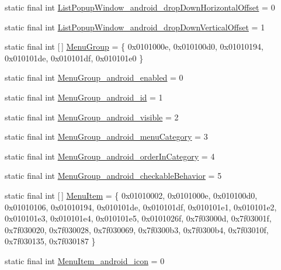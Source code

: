 \begin{DoxyCompactItemize}
static final int \mbox{\hyperlink{classandroid_1_1support_1_1design_1_1R_1_1styleable_a5cbe1721ac6cfb1ee789c9bf9756625f}{List\+Popup\+Window\+\_\+android\+\_\+drop\+Down\+Horizontal\+Offset}} = 0
\item 
static final int \mbox{\hyperlink{classandroid_1_1support_1_1design_1_1R_1_1styleable_a1530f5817ae4dc538e7282df67a530a0}{List\+Popup\+Window\+\_\+android\+\_\+drop\+Down\+Vertical\+Offset}} = 1
\item 
static final int \mbox{[}$\,$\mbox{]} \mbox{\hyperlink{classandroid_1_1support_1_1design_1_1R_1_1styleable_a39805bd4a947832cbac3bd5f30eef344}{Menu\+Group}} = \{ 0x0101000e, 0x010100d0, 0x01010194, 0x010101de, 0x010101df, 0x010101e0 \}
\item 
static final int \mbox{\hyperlink{classandroid_1_1support_1_1design_1_1R_1_1styleable_a1c4886b1aa7830d5f7de3e80324abcab}{Menu\+Group\+\_\+android\+\_\+enabled}} = 0
\item 
static final int \mbox{\hyperlink{classandroid_1_1support_1_1design_1_1R_1_1styleable_a150a7837cc130e393e2d497a2df1d310}{Menu\+Group\+\_\+android\+\_\+id}} = 1
\item 
static final int \mbox{\hyperlink{classandroid_1_1support_1_1design_1_1R_1_1styleable_ab7b47c5aa76f22fc272f685f8f50c208}{Menu\+Group\+\_\+android\+\_\+visible}} = 2
\item 
static final int \mbox{\hyperlink{classandroid_1_1support_1_1design_1_1R_1_1styleable_a650e6468d9a014506f9e2b1ca9185cbb}{Menu\+Group\+\_\+android\+\_\+menu\+Category}} = 3
\item 
static final int \mbox{\hyperlink{classandroid_1_1support_1_1design_1_1R_1_1styleable_a919b5d091d76ee965d77c57ff5b12647}{Menu\+Group\+\_\+android\+\_\+order\+In\+Category}} = 4
\item 
static final int \mbox{\hyperlink{classandroid_1_1support_1_1design_1_1R_1_1styleable_a6a6b6fb9de4775a9eea3bdded6d73190}{Menu\+Group\+\_\+android\+\_\+checkable\+Behavior}} = 5
\item 
static final int \mbox{[}$\,$\mbox{]} \mbox{\hyperlink{classandroid_1_1support_1_1design_1_1R_1_1styleable_a4c90afdbb461f2bfba191da26fbc881c}{Menu\+Item}} = \{ 0x01010002, 0x0101000e, 0x010100d0, 0x01010106, 0x01010194, 0x010101de, 0x010101df, 0x010101e1, 0x010101e2, 0x010101e3, 0x010101e4, 0x010101e5, 0x0101026f, 0x7f03000d, 0x7f03001f, 0x7f030020, 0x7f030028, 0x7f030069, 0x7f0300b3, 0x7f0300b4, 0x7f03010f, 0x7f030135, 0x7f030187 \}
\item 
static final int \mbox{\hyperlink{classandroid_1_1support_1_1design_1_1R_1_1styleable_af91278f37536d24b0e1d2283762c5fbc}{Menu\+Item\+\_\+android\+\_\+icon}} = 0

\end{DoxyCompactItemize}
